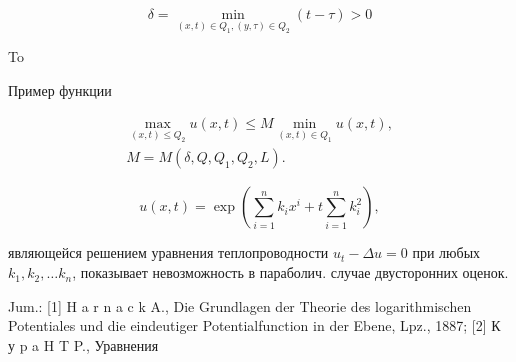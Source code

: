 \documentclass[10pt]{article}
\begin{document}
\[

\delta=\min _{(x, t) \in Q_{1},(y, \tau) \in Q_{2}}(t-\tau)>0

\]



To



Пример функции



\[

\begin{gathered}

\max _{(x, t) \leqslant Q_{2}} u(x, t) \leqslant M \min _{(x, t) \in Q_{1}} u(x, t), \\

M=M\left(\delta, Q, Q_{1}, Q_{2}, L\right) .

\end{gathered}

\]



\[

u(x, t)=\exp \left(\sum_{i=1}^{n} k_{i} x^{i}+t \sum_{i=1}^{n} k_{i}^{2}\right),

\]



являющейся решением уравнения теплопроводности $u_{t}-\Delta u=0$ при любых $k_{1}, k_{2}, \ldots k_{n}$, показывает невозможность в параболич. случае двусторонних оценок.



Jum.: [1] H a r n a c k A., Die Grundlagen der Theorie des logarithmischen Potentiales und die eindeutiger Potentialfunction in der Ebene, Lpz., 1887; [2] К у p a H T P., Уравнения
\end{document}
